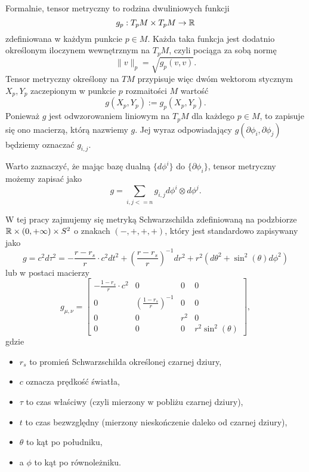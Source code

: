 Formalnie, tensor metryczny to rodzina dwuliniowych funkcji
$$ g_p:T_p M \times T_p M \to \mathbb{R} $$
zdefiniowana w każdym punkcie $p \in M$. Każda taka funkcja jest dodatnio określonym iloczynem wewnętrznym na $T_p M$, czyli pociąga za sobą normę 
$$ \|v\|_p=\sqrt{g_p (v, v)}. $$
Tensor metryczny określony na $T M$ przypisuje więc dwóm wektorom stycznym $X_p, Y_p$ zaczepionym w punkcie $p$ rozmaitości $M$ wartość
$$ g(X_p, Y_p):= g_p (X_p, Y_p). $$
Ponieważ $g$ jest odwzorowaniem liniowym na $T_p M$ dla każdego $p \in M$, to zapisuje się ono macierzą, którą nazwiemy $g$. Jej wyraz odpowiadający $g(\partial \phi_i, \partial \phi_j)$ będziemy oznaczać $g_{i,j}$.

Warto zaznaczyć, że mając bazę dualną $\{d \phi^i\}$ do $\{ \partial \phi_i\}$, tensor metryczny możemy zapisać jako
$$ g=\sum_{i, j <= n} g_{i, j} d \phi^i \otimes d \phi^j. $$

W tej pracy zajmujemy się metryką Schwarzschilda zdefiniowaną na podzbiorze $\mathbb{R} \times (0, +\infty) \times S^2$ o znakach $(-, +, +, +)$, który jest standardowo zapisywany jako
$$ g = c^2 d \tau^2 = -\frac{r - r_s}{r}\cdot c^2d t^2 + \left( \frac{r - r_s}{r}\right)^{-1} d r^2 + r^2(d \theta^2 + \sin^2(\theta) d \phi^2) $$
lub w postaci macierzy \cite{notatkiUoCSD}
$$
g_{\mu, \nu} = \begin{bmatrix}
  -\frac{1 - r_s}{r}\cdot c^2 & 0                               & 0   & 0 \\
  0                 & \left(\frac{1 - r_s}{r}\right)^{-1} & 0   & 0 \\
  0                 & 0                                   & r^2 & 0 \\ 
  0                 & 0                                   & 0   & r^2 \sin^2(\theta)
\end{bmatrix}, 
$$
gdzie 
\begin{itemize}
  \item $r_s$ to promień Schwarzschilda określonej czarnej dziury, 
  \item $c$ oznacza prędkość światła, 
  \item $\tau$ to czas właściwy (czyli mierzony w pobliżu czarnej dziury), 
  \item $t$ to czas bezwzględny (mierzony nieskończenie daleko od czarnej dziury), 
  \item $\theta$ to kąt po południku, 
  \item a $\phi$ to kąt po równoleżniku.
\end{itemize}

